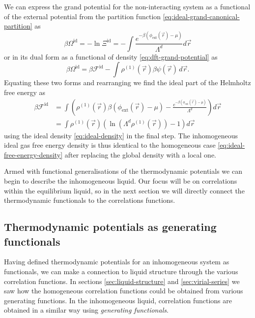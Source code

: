 We can express the grand potential for the non-interacting system as a functional of the external potential from the partition function \eqref{eq:ideal-grand-canonical-partition} as
\begin{equation*}
  \beta\Omega^\mathrm{id}
  =
  - \ln{\Xi^\mathrm{id}}
  =
  - \int \frac{e^{-\beta (\phi_\mathrm{ext}(\vec{r}) - \mu)}}{\Lambda^d} d\vec{r}
\end{equation*}
or in its dual form as a functional of density \eqref{eq:dft-grand-potential} as
\begin{equation*}
  \beta\Omega^\mathrm{id}
  =
  \beta \mathcal{F}^\mathrm{id}
  - \int \rho^{(1)}(\vec{r}) \beta \psi(\vec{r}) \, d\vec{r}.
\end{equation*}
Equating these two forms and rearranging we find the ideal part of the Helmholtz free energy as
\begin{align}
  \beta \mathcal{F}^\mathrm{id}
  &=
  \int
  \left(
  \rho^{(1)}(\vec{r}) \beta (\phi_\mathrm{ext}(\vec{r}) - \mu)
  - \frac{e^{-\beta (\phi_\mathrm{ext}(\vec{r}) - \mu)}}{\Lambda^d}
  \right)
  d\vec{r}
  \nonumber \\ &=
  \int
  \rho^{(1)}(\vec{r})
  \left(
  \ln{(\Lambda^d \rho^{(1)}(\vec{r}))} - 1
  \right)
  d\vec{r}
  \label{eq:ideal-free-energy-functional}
\end{align}
using the ideal density \eqref{eq:ideal-density} in the final step.
The inhomogeneous ideal gas free energy density is thus identical to the homogeneous case \eqref{eq:ideal-free-energy-density} after replacing the global density with a local one.

Armed with functional generalisations of the thermodynamic potentials we can begin to describe the inhomogeneous liquid.
Our focus will be on correlations within the equilibrium liquid, so in the next section we will directly connect the thermodynamic functionals to the correlations functions.

\subsection{Thermodynamic potentials as generating functionals}

Having defined thermodynamic potentials for an inhomogeneous system as functionals, we can make a connection to liquid structure through the various correlation functions.
In sections \ref{sec:liquid-structure} and \ref{sec:virial-series} we saw how the homogeneous correlation functions could be obtained from various generating functions.
In the inhomogeneous liquid, correlation functions are obtained in a similar way using \emph{generating functionals}.

